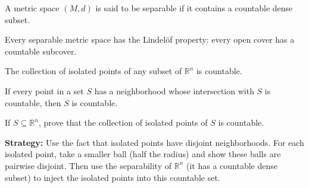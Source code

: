 \begin{definition}
A metric space $(M,d)$ is said to be separable if it contains a countable dense subset.
\end{definition}

\begin{theorem}
Every separable metric space has the Lindelöf property: every open cover has a countable subcover.
\end{theorem}

\begin{theorem}
The collection of isolated points of any subset of $\mathbb{R}^n$ is countable.
\end{theorem}

\begin{theorem}
If every point in a set $S$ has a neighborhood whose intersection with $S$ is countable, then $S$ is countable.
\end{theorem}



\begin{problembox}
\begin{problemstatement}
If \( S \subseteq \mathbb{R}^n \), prove that the collection of isolated points of \( S \) is countable.
\end{problemstatement}
\end{problembox}

\noindent\textbf{Strategy:} Use the fact that isolated points have disjoint neighborhoods. For each isolated point, take a smaller ball (half the radius) and show these balls are pairwise disjoint. Then use the separability of $\mathbb{R}^n$ (it has a countable dense subset) to inject the isolated points into this countable set.

